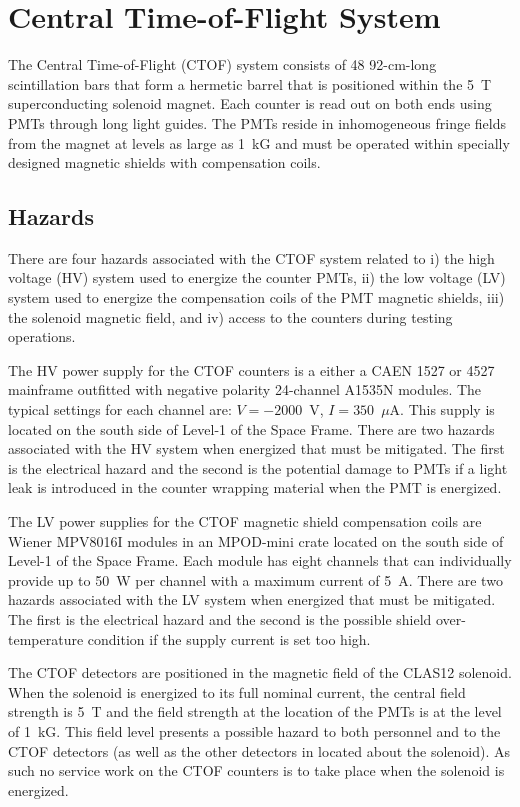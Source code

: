 \section{Central Time-of-Flight System}

The Central Time-of-Flight (CTOF) system consists of 48 92-cm-long scintillation bars 
that form a hermetic barrel that is positioned within the 5~T superconducting solenoid 
magnet. Each counter is read out on both ends using PMTs through long light guides. 
The PMTs reside in inhomogeneous fringe fields from the magnet at levels as large as 
1~kG and must be operated within specially designed magnetic shields with compensation 
coils.

\subsection{Hazards} 

There are four hazards associated with the CTOF system related to i) the high voltage (HV) 
system used to energize the counter PMTs, ii) the low voltage (LV) system used to energize 
the compensation coils of the PMT magnetic shields, iii) the solenoid magnetic field, and 
iv) access to the counters during testing operations.

The HV power supply for the CTOF counters is a either a CAEN 1527 or 4527 mainframe outfitted
with negative polarity 24-channel A1535N modules. The typical settings for each channel are: 
$V=-2000$~V, $I=350$~$\mu$A. This supply is located on the south side of Level-1 of the 
Space Frame. There are two hazards associated with the HV system when energized that must 
be mitigated. The first is the electrical hazard and the second is the potential damage to 
PMTs if a light leak is introduced in the counter wrapping material when the PMT is energized.

The LV power supplies for the CTOF magnetic shield compensation coils are Wiener MPV8016I 
modules in an MPOD-mini crate located on the south side of Level-1 of the Space Frame. Each 
module has eight channels that can individually provide up to 50~W per channel with a maximum 
current of 5~A. There are two hazards associated with the LV system when energized that must 
be mitigated. The first is the electrical hazard and the second is the possible shield 
over-temperature condition if the supply current is set too high.

The CTOF detectors are positioned in the magnetic field of the CLAS12 solenoid. When the 
solenoid is energized to its full nominal current, the central field strength is 5~T and the 
field strength at the location of the PMTs is at the level of 1~kG. This field level presents 
a possible hazard to both personnel and to the CTOF detectors (as well as the other detectors 
in located about the solenoid). As such no service work on the CTOF counters is to take place
when the solenoid is energized.

